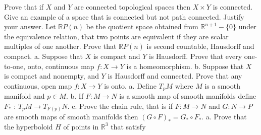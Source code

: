 \documentclass[14pt]{extarticle}
\begin{document}
\newpage
   Prove that if $X$ and $Y$ are connected topological spaces then $X \times Y$ is connected.
\newpage
   Give an example of a space that is connected but not path connected. Justify your answer.
\newpage
   Let $\mathbb{R} P(n)$ be the quotient space obtained from $\mathbb{R}^{n+1}-\{0\}$ under the equivalence relation, that two points are equivalent if they are scalar multiples of one another. Prove that $\mathbb{R} P(n)$ is second countable, Hausdorff and compact.
\newpage
a. Suppose that $X$ is compact and $Y$ is Hausdorff. Prove that every one-to-one, onto, continuous map $f: X \rightarrow Y$ is a homeomorphism.
b. Suppose that $X$ is compact and nonempty, and $Y$ is Hausdorff and connected. Prove that any continuous, open map $f: X \rightarrow Y$ is onto.
\newpage
a. Define $T_{p} M$ where $M$ is a smooth manifold and $p \in M$.
b. If $F: M \rightarrow N$ is a smooth map of smooth manifolds define $F_{*}$ : $T_{p} M \rightarrow T_{F(p)} N$.
c. Prove the chain rule, that is if $F: M \rightarrow N$ and $G: N \rightarrow P$ are smooth maps of smooth manifolds then $(G \circ F)_{*}=G_{*} \circ F_{*}$.
\newpage
a. Prove that the hyperboloid $H$ of points in $\mathbb{R}^{3}$ that satisfy
\end{document}
